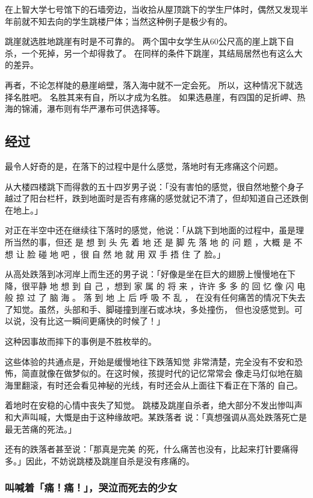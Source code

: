 \documentclass[UTF8]{ctexart}
\begin{document}
在上智大学七号馆下的石墙旁边，当收拾从屋顶跳下的学生尸体时，偶然又发现半 年前就不知去向的学生跳楼尸体；当然这种例子是极少有的。

跳崖就选胜地跳崖有时是不可靠的。
两个国中女学生从$60$公尺高的崖上跳下自杀，一个死掉，另一个却得救了。
在同样的条件下跳崖，其结局居然也有这么大的差异。

再者，不论怎样陡的悬崖峭壁，落入海中就不一定会死。
所以，这种情况下就选择名胜吧。
名胜其来有自，所以才成为名胜。
如果选悬崖，有四国的足折岬、热海的锦浦，瀑布则有华严瀑布可供选择等。

\subsection{经过}

最令人好奇的是，在落下的过程中是什么感觉，落地时有无疼痛这个问题。

从大楼四楼跳下而得救的五十四岁男子说：「没有害怕的感觉，很自然地整个身子越过了阳台栏杆，跌到地面时是否有疼痛的感觉就记不清了，但却知道自己还跌倒在地上。」

对正在半空中还在继续往下落时的感觉，他说：「从跳下到地面的过程中，虽是理所当然的事，但还 是 想 到 头 先 着 地 还 是 脚 先 落 地 的 问 题 ，大概 是 不 想 让 脸 碰 地 吧 ，很 自 然 地 就 用 双 手 捂 住 了 脸。」

从高处跌落到冰河岸上而生还的男子说：「好像是坐在巨大的翅膀上慢慢地在下降，很平静 地 想 到 自 己 ，想到 家 属 的 将 来 ，许许 多 多 的 回 忆 像 闪 电 般 掠 过 了 脑 海 。
落 到 地 上 后 呼 吸 不 乱 ， 在没有任何痛苦的情况下失去了知觉。虽然，头部和手、脚碰撞到崖石或冰块，多处撞伤， 但也没感觉到。可以说，没有比这一瞬间更痛快的时候了！」

 这种因事故而摔下的事例是不胜枚举的。

这些体验的共通点是，开始是缓慢地往下跌落知觉 非常清楚，完全没有不安和恐怖，简直就像在做梦似的。在这时候，孩提时代的记忆常常会 像走马灯似地在脑海里翻滚，有时还会看见神秘的光线，有时还会从上面往下看正在下落的 自己。

着地时在安稳的心情中丧失了知觉。 
跳楼及跳崖自杀者，绝大部分不发出惨叫声和大声叫喊，大慨是由于这种缘故吧。某跌落者 说：「真想强调从高处跌落死亡是最无苦痛的死法。」

还有的跌落者甚至说：「那真是完美 的死，什么痛苦也没有，比起来打针要痛得多。」因此，不妨说跳楼及跳崖自杀是没有疼痛的。 

\subsubsection*{叫喊着「痛！痛！」，哭泣而死去的少女}
\end{document}
